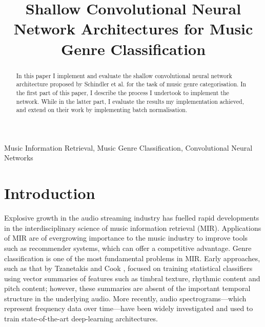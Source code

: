 \documentclass[conference]{IEEEtran}
\begin{document}

\title{Shallow Convolutional Neural Network Architectures for Music Genre Classification}

\author{
}

\maketitle

\begin{abstract}
In this paper I implement and evaluate the shallow convolutional neural network architecture proposed by Schindler et al. \cite{SchindlerLidyRauber} for the task of music genre categorisation.
In the first part of this paper, I describe the process I undertook to implement the network.
While in the latter part, I evaluate the results my implementation achieved, and extend on their work by implementing batch normalisation.
\end{abstract}

\begin{IEEEkeywords}
Music Information Retrieval, Music Genre Classification, Convolutional Neural Networks
\end{IEEEkeywords}

\section{Introduction}

Explosive growth in the audio streaming industry has fuelled rapid developments in the interdisciplinary science of music information retrieval (MIR).
Applications of MIR are of evergrowing importance to the music industry to improve tools such as recommender systems, which can offer a competitive advantage.
Genre classification is one of the most fundamental problems in MIR.
Early approaches, such as that by Tzanetakis and Cook \cite{TzanetakisCook}, focused on training statistical classifiers using vector summaries of features such as timbral texture, rhythmic content and pitch content; however, these summaries are absent of the important temporal structure in the underlying audio.
More recently, audio spectrograms---which represent frequency data over time---have been widely investigated and used to train state-of-the-art deep-learning architectures.
\end{document}
